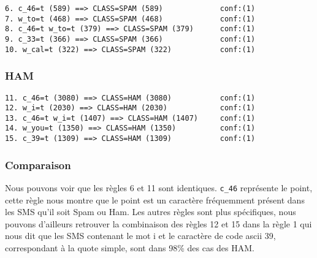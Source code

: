 \begin{verbatim}
6. c_46=t (589) ==> CLASS=SPAM (589)             conf:(1)
7. w_to=t (468) ==> CLASS=SPAM (468)             conf:(1)
8. c_46=t w_to=t (379) ==> CLASS=SPAM (379)      conf:(1)
9. c_33=t (366) ==> CLASS=SPAM (366)             conf:(1)
10. w_cal=t (322) ==> CLASS=SPAM (322)           conf:(1)
\end{verbatim}

\subsubsection{HAM}

\begin{verbatim}
11. c_46=t (3080) ==> CLASS=HAM (3080)           conf:(1)
12. w_i=t (2030) ==> CLASS=HAM (2030)            conf:(1)
13. c_46=t w_i=t (1407) ==> CLASS=HAM (1407)     conf:(1)
14. w_you=t (1350) ==> CLASS=HAM (1350)          conf:(1)
15. c_39=t (1309) ==> CLASS=HAM (1309)           conf:(1)
\end{verbatim}

\subsubsection{Comparaison}

Nous pouvons voir que les règles 6 et 11 sont identiques. \texttt{c\_46} représente le point, cette règle nous montre que le point est un caractère fréquemment présent dans les SMS qu'il soit Spam ou Ham. Les autres règles sont plus spécifiques, nous pouvons d'ailleurs retrouver la combinaison des règles 12 et 15 dans la règle 1 qui nous dit que les SMS contenant le mot \og i \fg{} et le caractère de code ascii 39, correspondant à la quote simple, sont dans 98\% des cas des HAM.
